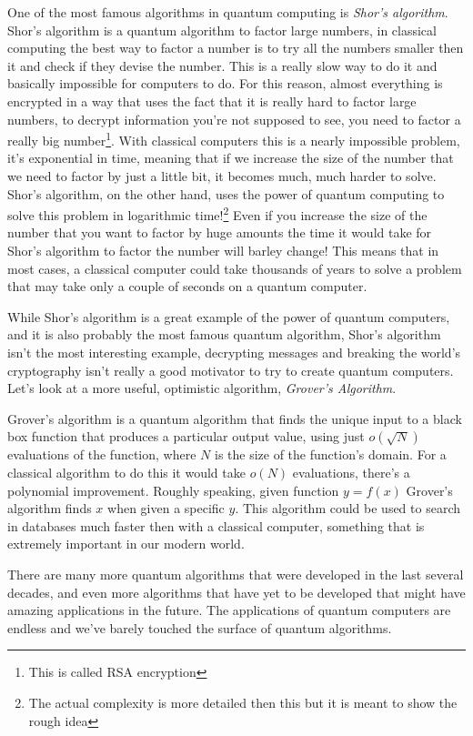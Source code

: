 \documentclass[english, a4paper, 12pt, twoside]{article}
\numberwithin{equation}{section} %
\begin{document}
One of the most famous algorithms in quantum computing is \textit{Shor's algorithm}. Shor's algorithm is a quantum algorithm to factor large numbers, in classical computing the best way to factor a number is to try all the numbers smaller then it and check if they devise the number. This is a really slow way to do it and basically impossible for computers to do. For this reason, almost everything is encrypted in a way that uses the fact that it is really hard to factor large numbers, to decrypt information you're not supposed to see, you need to factor a really big number\footnote{This is called RSA encryption}. With classical computers this is a nearly impossible problem, it's exponential in time, meaning that if we increase the size of the number that we need to factor by just a little bit, it becomes much, much harder to solve. Shor's algorithm, on the other hand, uses the power of quantum computing to solve this problem in logarithmic time!\footnote{The actual complexity is more detailed then this but it is meant to show the rough idea} Even if you increase the size of the number that you want to factor by huge amounts the time it would take for Shor's algorithm to factor the number will barley change! This means that in most cases, a classical computer could take thousands of years to solve a problem that may take only a couple of seconds on a quantum computer. 

While Shor's algorithm is a great example of the power of quantum computers, and it is also probably the most famous quantum algorithm, Shor's algorithm isn't the most interesting example, decrypting messages and breaking the world's cryptography isn't really a good motivator to try to create quantum computers. Let's look at a more useful, optimistic algorithm, \textit{Grover's Algorithm}.

Grover's algorithm is a quantum algorithm that finds the unique input to a black box function that produces a particular output value, using just $o(\sqrt {N})$ evaluations of the function, where $N$ is the size of the function's domain. For a classical algorithm to do this it would take $o(N)$ evaluations, there's a polynomial improvement. Roughly speaking, given function $y = f(x)$ Grover's algorithm finds $x$ when given a specific $y$. This algorithm could be used to search in databases much faster then with a classical computer, something that is extremely important in our modern world.

There are many more quantum algorithms that were developed in the last several decades, and even more algorithms that have yet to be developed that might have amazing applications in the future. The applications of quantum computers are endless and we've barely touched the surface of quantum algorithms.
\end{document}
